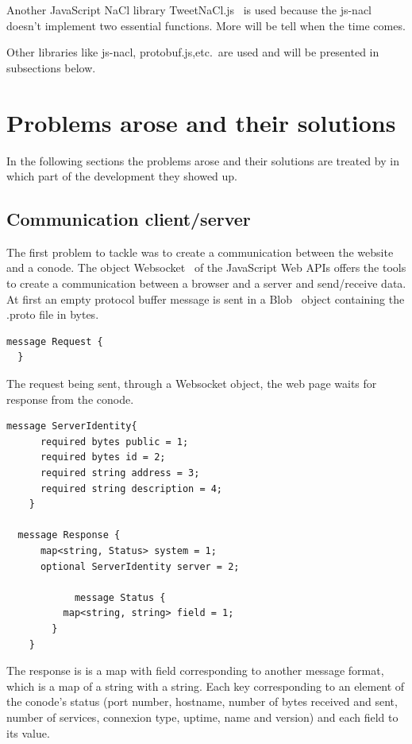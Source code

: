 \documentclass[11pt, a4paper, twoside, openright, openany]{book} %
\begin{document}
Another JavaScript NaCl library TweetNaCl.js~\cite{tweetNacl} is used because
the js-nacl doesn't implement two essential functions.
More will be tell when the time comes.
\bigbreak

Other libraries like js-nacl, protobuf.js,etc.\ are used and will be presented
in subsections below.
\bigbreak

\chapter{Problems arose and their solutions}
In the following sections the problems arose and their solutions are treated by
in which part of the development they showed up.
\bigbreak

\section{Communication client/server}
The first problem to tackle was to create a communication between the website
and a conode.
\newline
The object Websocket~\cite{websocketPage} of the JavaScript Web APIs offers the tools to create a communication
between a browser and a server and send/receive data.
\newline
At first an empty protocol buffer message is sent in a Blob~\cite{blob} object containing
the .proto file in bytes.
\bigbreak

\begin{lstlisting}[caption={Empty protocol buffer message}, captionpos=b]
  message Request {
  }
\end{lstlisting}

The request being sent, through a Websocket object, the web page waits for response from the conode.
\bigbreak

\begin{lstlisting}[caption={response protocol buffer message}, captionpos=b]
  message ServerIdentity{
      required bytes public = 1;
      required bytes id = 2;
      required string address = 3;
      required string description = 4;
	}

  message Response {
      map<string, Status> system = 1;
      optional ServerIdentity server = 2;

			message Status {
          map<string, string> field = 1;
    	}
	}
\end{lstlisting}
\leavevmode \newline

The response is is a map with field corresponding to another message format, which
is a map of a string with a string. Each key corresponding to an element of the conode's
status (port number, hostname, number of bytes received and sent, number of services,
 connexion type, uptime, name and version) and each field to its value.
\bigbreak
\end{document}
